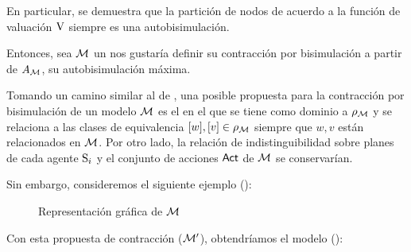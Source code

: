 En particular, se demuestra que la partición de nodos de acuerdo a la función de valuación $\V$ siempre es una autobisimulación.

Entonces, sea $\modults$ un \ults nos gustaría definir su contracción por bisimulación a partir de $A_\modults$, 
su autobisimulación máxima.

Tomando un camino similar al de \bml, una posible propuesta para la contracción por bisimulación de un modelo $\model$ 
es el \ults en el que se tiene como dominio a $\rho_\modults$ y 
se relaciona a las clases de equivalencia $[w], [v] \in \rho_\modults$ siempre que $w, v$ están relacionados en $\modults$. 
Por otro lado, la relación de indistinguibilidad sobre planes de cada agente $\S_i$ y el conjunto de acciones $\ACT$ de $\modults$ 
se conservarían.

Sin embargo, consideremos el siguiente ejemplo ():

\begin{figure}[h]
    \hspace{3.4cm}
    \vspace{0.1cm}
    \hspace{1cm}
    \caption{Representación gráfica de $\modults$}
    \label{fig:1stproposaloriginal}
\end{figure}

Con esta propuesta de contracción ($\modults'$), obtendríamos el modelo ():

